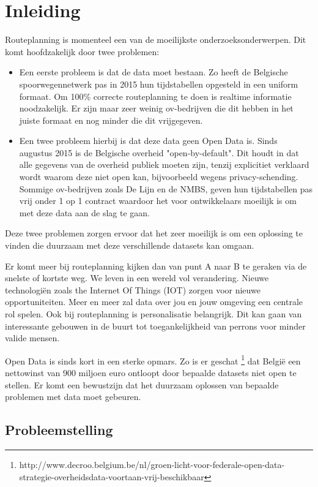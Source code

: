 
\chapter{Inleiding}

Routeplanning is momenteel een van de moeilijkste onderzoeksonderwerpen. Dit komt hoofdzakelijk door twee problemen:

\begin{itemize}
\item Een eerste probleem is dat de data moet bestaan. Zo heeft de Belgische spoorwegennetwerk pas in 2015 hun tijdstabellen opgesteld in een uniform formaat.  Om 100\% correcte routeplanning te doen is realtime informatie noodzakelijk. Er zijn maar zeer weinig ov-bedrijven die dit hebben in het juiste formaat en nog minder die dit vrijgegeven.
\item Een twee probleem hierbij is dat deze data geen Open Data is. Sinds augustus 2015 is de Belgische overheid "open-by-default". Dit houdt in dat alle gegevens van de overheid publiek moeten zijn, tenzij explicitiet verklaard wordt waarom deze niet open kan, bijvoorbeeld wegens privacy-schending. Sommige ov-bedrijven zoals De Lijn en de NMBS, geven hun tijdstabellen pas vrij onder 1 op 1 contract waardoor het voor ontwikkelaars moeilijk is om met deze data aan de slag te gaan.\end{itemize}

Deze twee problemen zorgen ervoor dat het zeer moeilijk is om een oplossing te vinden die duurzaam met deze verschillende datasets kan omgaan.

Er komt meer bij routeplanning kijken dan van punt A naar B te geraken via de snelste of kortste weg. We leven in een wereld vol verandering. Nieuwe technologi\"en zoals the Internet Of Things (IOT) zorgen voor nieuwe opportuniteiten. Meer en meer zal data over jou en jouw omgeving een centrale rol spelen. Ook bij routeplanning is personalisatie belangrijk. Dit kan gaan van interessante gebouwen in de buurt tot toegankelijkheid van perrons voor minder valide mensen.

Open Data is sinds kort in een sterke opmars. Zo is er geschat \footnote{http://www.decroo.belgium.be/nl/groen-licht-voor-federale-open-data-strategie-overheidsdata-voortaan-vrij-beschikbaar} dat Belgi\"e een nettowinst van 900 miljoen euro ontloopt door bepaalde datasets niet open te stellen. Er komt een bewustzijn dat het duurzaam oplossen van bepaalde problemen met data moet gebeuren. 

\section{Probleemstelling}

